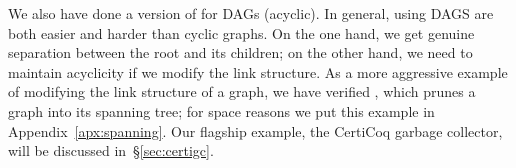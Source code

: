 We also have done a version of  for DAGs (acyclic).  In general, using DAGS 
are both easier and harder than cyclic graphs.  On the one hand, we get genuine separation 
between the root and its children; on the other hand, we need to maintain acyclicity if
we modify the link structure.
As a more aggressive example of modifying the link structure of a graph, we have verified 
, which prunes a graph into its spanning tree; for space reasons we put
this example in Appendix~\ref{apx:spanning}.
Our flagship example, the CertiCoq garbage collector, will be discussed in~\S\ref{sec:certigc}.


